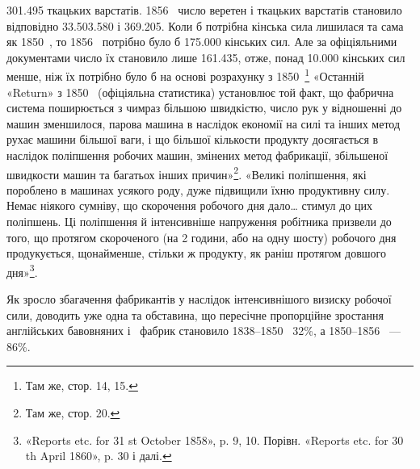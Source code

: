 \num{301.495} ткацьких варстатів. 1856~ число веретен і ткацьких
варстатів становило відповідно \num{33.503.580} і \num{369.205}. Коли б
потрібна кінська сила лишилася та сама як 1850~, то 1856~
потрібно було б \num{175.000} кінських сил. Але за офіціяльними документами
число їх становило лише \num{161.435}, отже, понад \num{10.000}
кінських сил менше, ніж їх потрібно було б на основі розрахунку
з 1850~\footnote{
Там же, стор. 14, 15.
} «Останній «Return» з 1850~ (офіціяльна статистика)
установлює той факт, що фабрична система поширюється з чимраз
більшою швидкістю, число рук у відношенні до машин зменшилося,
парова машина в наслідок економії на силі та інших
метод рухає машини більшої ваги, і що більшої кількости продукту
досягається в наслідок поліпшення робочих машин, змінених
метод фабрикації, збільшеної швидкости машин та багатьох інших
причин»\footnote{
Там же, стор. 20.
}. «Великі поліпшення, які пороблено в машинах
усякого роду, дуже підвищили їхню продуктивну силу. Немає
ніякого сумніву, що скорочення робочого дня дало\dots{} стимул
до цих поліпшень. Ці поліпшення й інтенсивніше напруження
робітника призвели до того, що протягом скороченого (на 2 години,
або на одну шосту) робочого дня продукується, щонайменше,
стільки ж продукту, як раніш протягом довшого дня»\footnote{
«Reports etc. for 31 st October 1858», p. 9, 10. Порівн. «Reports
etc. for 30 th April 1860», p. 30 і далі.
}.

Як зросло збагачення фабрикантів у наслідок інтенсивнішого
визиску робочої сили, доводить уже одна та обставина, що пересічне
пропорційне зростання англійських бавовняних і~
фабрик становило 1838--1850~ 32\%, а 1850--1856~ — 86\%.

